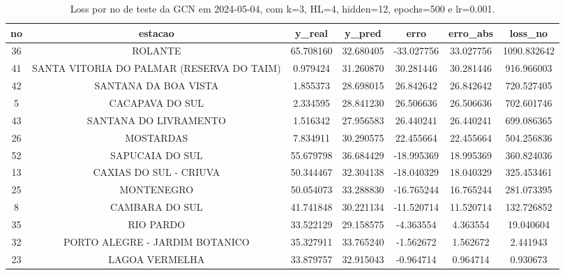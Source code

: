 \begin{table}[h]
\centering
\caption{Loss por no de teste da GCN em 2024-05-04, com k=3, HL=4, hidden=12, epochs=500 e lr=0.001.}
\label{tab:gcn_loss_k3_hl4_h12_e500_d20240504}
\begin{tabular}{ccccccc}
\toprule
no & estacao & y\_real & y\_pred & erro & erro\_abs & loss\_no \\
\midrule
36 & ROLANTE & 65.708160 & 32.680405 & -33.027756 & 33.027756 & 1090.832642 \\
41 & SANTA VITORIA DO PALMAR (RESERVA DO TAIM) & 0.979424 & 31.260870 & 30.281446 & 30.281446 & 916.966003 \\
42 & SANTANA DA BOA VISTA & 1.855373 & 28.698015 & 26.842642 & 26.842642 & 720.527405 \\
5 & CACAPAVA DO SUL & 2.334595 & 28.841230 & 26.506636 & 26.506636 & 702.601746 \\
43 & SANTANA DO LIVRAMENTO & 1.516342 & 27.956583 & 26.440241 & 26.440241 & 699.086365 \\
26 & MOSTARDAS & 7.834911 & 30.290575 & 22.455664 & 22.455664 & 504.256836 \\
52 & SAPUCAIA DO SUL & 55.679798 & 36.684429 & -18.995369 & 18.995369 & 360.824036 \\
13 & CAXIAS DO SUL - CRIUVA & 50.344467 & 32.304138 & -18.040329 & 18.040329 & 325.453461 \\
25 & MONTENEGRO & 50.054073 & 33.288830 & -16.765244 & 16.765244 & 281.073395 \\
8 & CAMBARA DO SUL & 41.741848 & 30.221134 & -11.520714 & 11.520714 & 132.726852 \\
35 & RIO PARDO & 33.522129 & 29.158575 & -4.363554 & 4.363554 & 19.040604 \\
32 & PORTO ALEGRE - JARDIM BOTANICO & 35.327911 & 33.765240 & -1.562672 & 1.562672 & 2.441943 \\
23 & LAGOA VERMELHA & 33.879757 & 32.915043 & -0.964714 & 0.964714 & 0.930673 \\
\bottomrule
\end{tabular}
\end{table}
